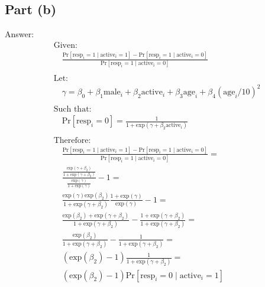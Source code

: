 \documentclass[12pt, a4paper]{article}
\begin{document}
\subsection*{Part (b)}
Answer:
\begin{align*}
    &\text{Given:}\\
    &\quad\frac{\text{Pr}[\text{resp}_i = 1\;|\;\text{active}_i=1] - \text{Pr}[\text{resp}_i = 1\;|\;\text{active}_i=0]}{\text{Pr}[\text{resp}_i = 1\;|\;\text{active}_i=0]}\\\\
    &\text{Let: }\\
    &\quad\gamma = \beta_0 + \beta_1\text{male}_i+\beta_2\text{active}_i+\beta_3\text{age}_i+\beta_4(\text{age}_i/10)^2\\\\
    &\text{Such that:}\\
    &\quad\text{Pr}[\text{resp}_i = 0] = \frac{1}{1+\text{exp}(\gamma + \beta_2\text{active}_i)}\\\\
    &\text{Therefore:}\\
    &\quad\frac{\text{Pr}[\text{resp}_i = 1\;|\;\text{active}_i=1] - \text{Pr}[\text{resp}_i = 1\;|\;\text{active}_i=0]}{\text{Pr}[\text{resp}_i = 1\;|\;\text{active}_i=0]}=\\
    &\quad\frac{\frac{\text{exp}(\gamma + \beta_2)}{1+\text{exp}(\gamma + \beta_2)}}{\frac{\text{exp}(\gamma)}{1+\text{exp}(\gamma)}} -1=\\
    &\quad\frac{\text{exp}(\gamma)\text{exp}(\beta_2)}{1+\text{exp}(\gamma + \beta_2)}\frac{1+\text{exp}(\gamma)}{\text{exp}(\gamma)} - 1=\\
    &\quad\frac{\text{exp}(\beta_2)+\text{exp}(\gamma + \beta_2)}{1+\text{exp}(\gamma + \beta_2)} - \frac{1+\text{exp}(\gamma + \beta_2)}{1+\text{exp}(\gamma + \beta_2)}=\\
    &\quad\frac{\text{exp}(\beta_2)}{1+\text{exp}(\gamma + \beta_2)} - \frac{1}{1+\text{exp}(\gamma + \beta_2)}=\\
    &\quad(\text{exp}(\beta_2)-1)\frac{1}{1+\text{exp}(\gamma + \beta_2)}=\\
    &\quad(\text{exp}(\beta_2)-1)\text{Pr}[\text{resp}_i = 0\;|\;\text{active}_i=1]
\end{align*}
\vspace{1em}
\end{document}
